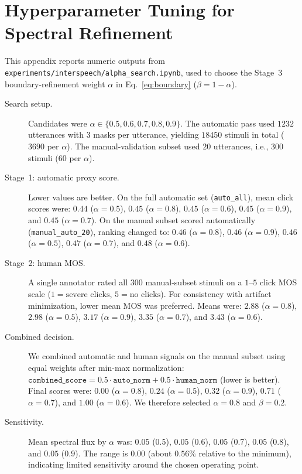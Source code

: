 \documentclass[cameraready]{Interspeech}
\begin{document}



\appendix

\section{Hyperparameter Tuning for Spectral Refinement}
\label{app:hyperparam}

This appendix reports numeric outputs from \texttt{experiments/interspeech/alpha\_search.ipynb}, used to choose the Stage~3 boundary-refinement weight $\alpha$ in Eq.~\ref{eq:boundary} ($\beta = 1-\alpha$).

\begin{description}
  \item[Search setup.] Candidates were $\alpha \in \{0.5,0.6,0.7,0.8,0.9\}$. The automatic pass used $1232$ utterances with $3$ masks per utterance, yielding $18450$ stimuli in total ($3690$ per $\alpha$). The manual-validation subset used $20$ utterances, i.e., $300$ stimuli ($60$ per $\alpha$).

  \item[Stage~1: automatic proxy score.] Lower values are better. On the full automatic set (\texttt{auto\_all}), mean click scores were: $0.44$ ($\alpha=0.5$), $0.45$ ($\alpha=0.8$), $0.45$ ($\alpha=0.6$), $0.45$ ($\alpha=0.9$), and $0.45$ ($\alpha=0.7$). On the manual subset scored automatically (\texttt{manual\_auto\_20}), ranking changed to: $0.46$ ($\alpha=0.8$), $0.46$ ($\alpha=0.9$), $0.46$ ($\alpha=0.5$), $0.47$ ($\alpha=0.7$), and $0.48$ ($\alpha=0.6$).

  \item[Stage~2: human MOS.] A single annotator rated all $300$ manual-subset stimuli on a $1$--$5$ click MOS scale ($1=\text{severe clicks}$, $5=\text{no clicks}$). For consistency with artifact minimization, lower mean MOS was preferred. Means were: $2.88$ ($\alpha=0.8$), $2.98$ ($\alpha=0.5$), $3.17$ ($\alpha=0.9$), $3.35$ ($\alpha=0.7$), and $3.43$ ($\alpha=0.6$).

  \item[Combined decision.] We combined automatic and human signals on the manual subset using equal weights after min-max normalization: $\texttt{combined\_score} = 0.5 \cdot \texttt{auto\_norm} + 0.5 \cdot \texttt{human\_norm}$ (lower is better). Final scores were: $0.00$ ($\alpha=0.8$), $0.24$ ($\alpha=0.5$), $0.32$ ($\alpha=0.9$), $0.71$ ($\alpha=0.7$), and $1.00$ ($\alpha=0.6$). We therefore selected $\alpha=0.8$ and $\beta=0.2$.

  \item[Sensitivity.] Mean spectral flux by $\alpha$ was: $0.05$ (0.5), $0.05$ (0.6), $0.05$ (0.7), $0.05$ (0.8), and $0.05$ (0.9). The range is $0.00$ (about $0.56\%$ relative to the minimum), indicating limited sensitivity around the chosen operating point.
\end{description}
\end{document}
